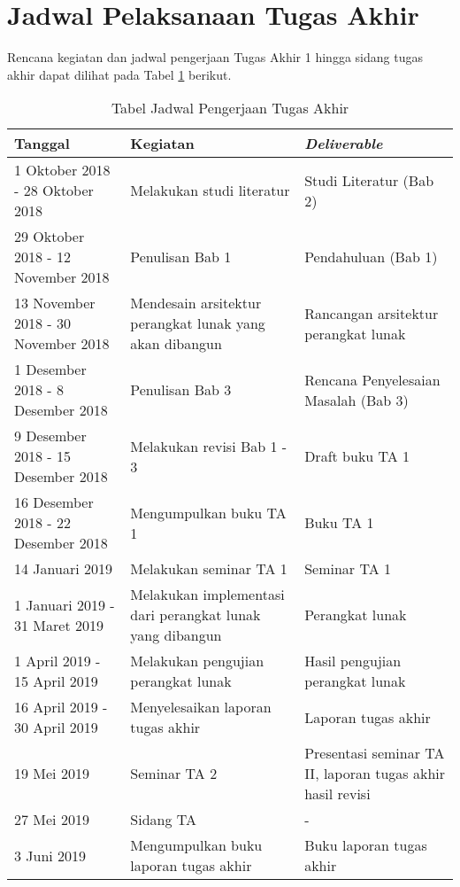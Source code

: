 \section{Jadwal Pelaksanaan Tugas Akhir}

\par Rencana kegiatan dan jadwal pengerjaan Tugas Akhir 1 hingga sidang tugas akhir dapat dilihat pada Tabel \ref{tab:final-project-schedule} berikut.

\begin{longtable}{|p{}|p{}|p{}|}
	\caption{Tabel Jadwal Pengerjaan Tugas Akhir}
	\label{tab:final-project-schedule}
	\endfirsthead
	\endhead
	\hline
	Tanggal & Kegiatan & \textit{Deliverable} \\\hline
	1 Oktober 2018 - 28 Oktober 2018 & Melakukan studi literatur & Studi Literatur (Bab 2) \\ \hline
	29 Oktober 2018 - 12 November 2018 & Penulisan Bab 1 & Pendahuluan (Bab 1) \\ \hline
	13 November 2018 - 30 November 2018 & Mendesain arsitektur perangkat lunak yang akan dibangun & Rancangan arsitektur perangkat lunak \\ \hline
	1 Desember 2018 - 8 Desember 2018 & Penulisan Bab 3 & Rencana Penyelesaian Masalah (Bab 3) \\ \hline
	9 Desember 2018 - 15 Desember 2018 & Melakukan revisi Bab 1 - 3 & Draft buku TA 1 \\ \hline
	16 Desember 2018 - 22 Desember 2018 & Mengumpulkan buku TA 1 & Buku TA 1 \\ \hline
	14 Januari 2019 & Melakukan seminar TA 1 & Seminar TA 1 \\ \hline
	1 Januari 2019 - 31 Maret 2019 & Melakukan implementasi dari perangkat lunak yang dibangun & Perangkat lunak \\ \hline
	1 April 2019 - 15 April 2019 & Melakukan pengujian perangkat lunak & Hasil pengujian perangkat lunak \\ \hline
	16 April 2019 - 30 April 2019 & Menyelesaikan laporan tugas akhir & Laporan tugas akhir \\ \hline
	19 Mei 2019 & Seminar TA 2 & Presentasi seminar TA II, laporan tugas akhir hasil revisi \\ \hline
	27 Mei 2019 & Sidang TA & - \\ \hline
	3 Juni 2019 & Mengumpulkan buku laporan tugas akhir & Buku laporan tugas akhir \\
	\hline
\end{longtable}
